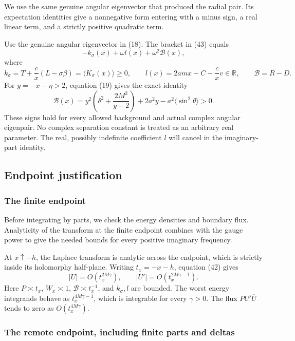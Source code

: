 \documentclass[11pt,a4paper]{article}
\begin{document}
We use the same genuine angular eigenvector that produced the radial pair. Its expectation identities give a nonnegative form entering with a minus sign, a real linear term, and a strictly positive quadratic term.

Use the genuine angular eigenvector in (18). The bracket in (43) equals
\[
 -k_\sigma(x)+\omega l(x)+\omega^2\mathcal B(x),
 \tag{45}
\] where \[
 k_\sigma=T+\frac c x(L-\sigma\beta)
       =\langle K_\sigma(x)\rangle\ge0,\qquad
 l(x)=2amx-C-\frac c x v\in\mathbb R,\qquad
 \mathcal B=R-D.
\] For \(y=-x-\eta>2\), equation (19) gives the exact identity \[
 \mathcal B(x)=
 y^2\left(\delta^2+\frac{2M^2}{y-2}\right)
 +2a^2y-a^2\langle\sin^2\theta\rangle>0 .
 \tag{46}
\] These signs hold for every allowed background and actual complex
angular eigenpair. No complex separation constant is treated as an
arbitrary real parameter. The real, possibly indefinite coefficient
\(l\) will cancel in the imaginary-part identity.

\subsection{Endpoint justification}\label{endpoint-justification}

\subsubsection{The finite endpoint}\label{readable-finite-endpoint}

Before integrating by parts, we check the energy densities and boundary flux. Analyticity of the transform at the finite endpoint combines with the gauge power to give the needed bounds for every positive imaginary frequency.

At \(x\uparrow-h\), the Laplace transform is analytic across the
endpoint, which is strictly inside its holomorphy half-plane. Writing
\(t_x=-x-h\), equation (42) gives \[
 |U|=O(t_x^{2M\gamma}),\qquad
 |U'|=O(t_x^{2M\gamma-1}).
 \tag{47}
\] Here \(P\asymp t_x\), \(W_x\asymp1\), \(\mathcal B\asymp t_x^{-1}\),
and \(k_\sigma,l\) are bounded. The worst energy integrands behave as
\(t_x^{4M\gamma-1}\), which is integrable for every \(\gamma>0\). The
flux \(PU'\overline U\) tends to zero as \(O(t_x^{4M\gamma})\).

\subsubsection{The remote endpoint, including finite parts and deltas}\label{readable-remote-endpoint}
\end{document}
